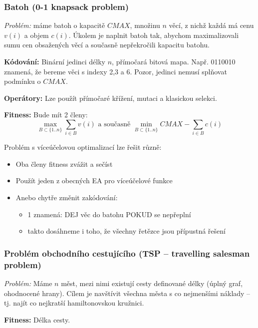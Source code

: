 \subsubsection{Batoh (0-1 knapsack problem)}
\textit{Problém:} máme batoh o kapacitě $CMAX$, množinu $n$ věcí, z nichž každá má cenu $v(i)$ a objem $c(i)$. Úkolem je naplnit batoh tak, abychom maximalizovali sumu cen obsažených věcí a současně nepřekročili kapacitu batohu.

\textbf{Kódování:} Binární jedinci délky $n$, přímočará bitová mapa. Např. 0110010 znamená, že bereme věci s indexy 2,3 a 6. Pozor, jedinci nemusí splňovat podmínku o $CMAX$.

\textbf{Operátory:} Lze použít přímočaré křížení, mutaci a klasickou selekci.

\textbf{Fitness:} Bude mít 2 členy: 
$$\max\limits_{B \subset \{1..n\}} \sum\limits_{i \in B} v(i) \text{\ \ a současně\ \ } \min\limits_{B \subset \{1..n\}} CMAX - \sum\limits_{i \in B} c(i)$$

Problém s víceúčelovou optimalizací lze řešit různě:
\begin{itemize}
	
	
	\item Oba členy fitness zvážit a sečíst
	\item Použít jeden z obecných EA pro víceúčelové funkce
	\item Anebo chytře změnit zakódování:
	\begin{itemize}	
		
		
		\item 1 znamená: DEJ věc do batohu POKUD se nepřeplní
		\item takto dosáhneme i toho, že všechny řetězce jsou přípustná řešení
	\end{itemize}
\end{itemize}

\subsubsection{Problém obchodního cestujícího (TSP -- travelling salesman problem)}
\textit{Problém:} Máme $n$ měst, mezi nimi existují cesty definované délky (úplný graf, ohodnocené hrany). Cílem je navštívit všechna města s co nejmenšími náklady -- tj. najít co nejkratší hamiltonovskou kružnici.

\textbf{Fitness:} Délka cesty.

